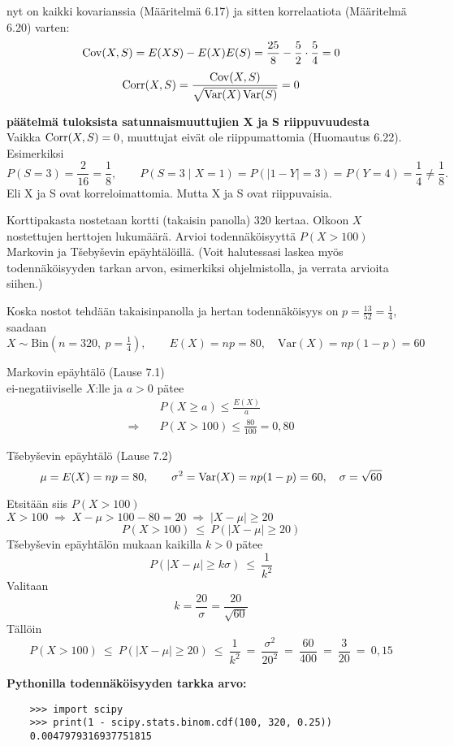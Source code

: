 \documentclass[12pt,a4paper]{article}
\begin{document}
\pagebreak
nyt on kaikki kovarianssia (Määritelmä 6.17) ja sitten korrelaatiota (Määritelmä 6.20) varten:
\[
\operatorname{Cov}(X,S)=E(XS)-E(X)E(S)
=\frac{25}{8}-\frac52\cdot\frac54=0
\]
\[
\operatorname{Corr}(X,S)=\frac{\operatorname{Cov}(X,S)}{\sqrt{\operatorname{Var}(X)\operatorname{Var}(S)}}=0
\]

\vspace{0.8cm}

\textbf{päätelmä tuloksista satunnaismuuttujien X ja S riippuvuudesta}\\

Vaikka $\operatorname{Corr}(X,S)=0$, muuttujat eivät ole riippumattomia (Huomautus 6.22).\\

Esimerkiksi
\[
P(S=3)=\frac{2}{16}=\frac18,\qquad
P(S=3\mid X=1)=P(|1-Y|=3)=P(Y=4)=\frac14\neq \frac18.
\]
Eli X ja S ovat korreloimattomia. Mutta X ja S ovat riippuvaisia.


\pagebreak
{}
Korttipakasta nostetaan kortti (takaisin panolla) 320 kertaa. Olkoon $X$ nostettujen herttojen lukumäärä. Arvioi todennäköisyyttä $P(X>100)$ Markovin ja T\v seby\v sevin epäyhtälöillä. (Voit halutessasi laskea myös todennäköisyyden tarkan arvon, esimerkiksi ohjelmistolla, ja verrata arvioita siihen.)

\vspace{0.4cm}

Koska nostot tehdään takaisinpanolla ja hertan todennäköisyys on $p=\tfrac{13}{52}=\tfrac14$, saadaan
\[
X\sim\mathrm{Bin}(n=320,\ p=\tfrac14),\qquad
E(X)=np=80,\quad
\mathrm{Var}(X)=np(1-p)=60
\]

\begin{kohta}
  \item Markovin epäyhtälö (Lause 7.1)\\
  ei-negatiiviselle $X$:lle ja $a>0$ pätee
  \[
  \begin{aligned}
  &P(X\ge a)\le \frac{E(X)}{a}\\
  \Rightarrow \quad &P(X> 100)\le \frac{80}{100}=0{,}80
  \end{aligned}
  \]


\item T\v{s}eby\v{s}evin epäyhtälö (Lause 7.2)\\


\[
\mu=E(X)=np=80,\qquad \sigma^2=\operatorname{Var}(X)=np(1-p)=60,\quad \sigma=\sqrt{60}
\]

Etsitään siis $P(X>100)$ \\
$X>100 \;\Rightarrow\; X-\mu > 100-80 = 20 \;\Rightarrow\; |X-\mu|\ge 20$
\[
P(X>100)\ \le\ P(|X-\mu|\ge 20)
\]
T\v{s}eby\v{s}evin epäyhtälön mukaan kaikilla $k>0$ pätee
\[
P(|X-\mu|\ge k\sigma)\ \le\ \frac{1}{k^2}
\]
Valitaan\\
\[
k=\dfrac{20}{\sigma}=\dfrac{20}{\sqrt{60}}
\]
Tällöin
\[
P(X>100)\ \le\ P(|X-\mu|\ge 20)
\ \le\ \frac{1}{k^2}
\ =\ \frac{\sigma^2}{20^2}
\ =\ \frac{60}{400}
\ =\ \frac{3}{20}
\ =\ 0{,}15
\]

\end{kohta}

\textbf{Pythonilla todennäköisyyden tarkka arvo:}
\begin{verbatim}
    >>> import scipy
    >>> print(1 - scipy.stats.binom.cdf(100, 320, 0.25))
    0.0047979316937751815
\end{verbatim}
\end{document}
